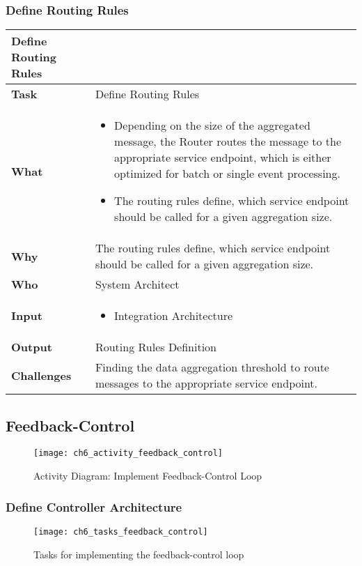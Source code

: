 \subsubsection{Define Routing Rules}
\begin{tabularx}{\textwidth}{@{} l X @{}}
	\caption{table}{Define Routing Rules} \label{table:ch6_Task_Define_Routing_Rules}\\
	\toprule 
	\bfseries Task & Define Routing Rules\\
	\midrule 
	\bfseries What & 
	\begin{itemize}
		\item Depending on the size of the aggregated message, the Router routes the message to the appropriate service endpoint, which is either optimized for batch or single event processing.
		\item The routing rules define, which service endpoint should be called for a given aggregation size.
	\end{itemize}
	\\
	\midrule 
	\bfseries Why & The routing rules define, which service endpoint should be called for a given aggregation size.\\
	\midrule
	\bfseries Who & System Architect\\
	\midrule
	\bfseries Input & 
		\begin{itemize}
			\item Integration Architecture
		\end{itemize}
	\\
	\midrule 
	\bfseries Output & Routing Rules Definition\\
	\midrule 
	\bfseries Challenges & Finding the data aggregation threshold to route messages to the appropriate service endpoint.\\
	\bottomrule 
\end{tabularx}

\subsection{Feedback-Control}

\begin{figure}[htpb] \centering 
	\texttt{[image: ch6\_activity\_feedback\_control]} 
	\caption{Activity Diagram: Implement Feedback-Control Loop} 
	\label{fig:ch6_activiy_feedback_control} 
\end{figure}

\subsubsection{Define Controller Architecture}
\begin{figure}[htpb] \centering 
	\texttt{[image: ch6\_tasks\_feedback\_control]} 
	\caption{Tasks for implementing the feedback-control loop} 
	\label{fig:ch6_tasks_feedback_control} 
\end{figure}

